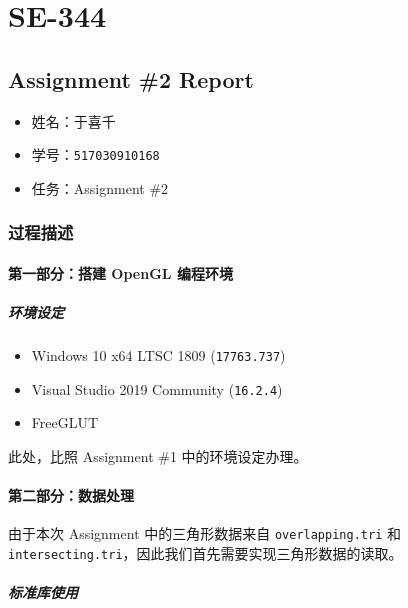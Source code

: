 \documentclass[
]{article}
\date{}
\begin{document}
\hypertarget{header-n0}{%
\section{SE-344}\label{header-n0}}

\hypertarget{header-n2}{%
\subsection{Assignment \#2 Report}\label{header-n2}}

\begin{itemize}
\item
  姓名：于喜千
\item
  学号：\texttt{517030910168}
\item
  任务：Assignment \#2
\end{itemize}

\hypertarget{header-n10}{%
\subsubsection{过程描述}\label{header-n10}}

\hypertarget{header-n11}{%
\paragraph{第一部分：搭建 OpenGL 编程环境}\label{header-n11}}

\hypertarget{header-n12}{%
\subparagraph{环境设定}\label{header-n12}}

\begin{itemize}
\item
  Windows 10 x64 LTSC 1809 (\texttt{17763.737})
\item
  Visual Studio 2019 Community (\texttt{16.2.4})
\item
  FreeGLUT
\end{itemize}

此处，比照 Assignment \#1 中的环境设定办理。

\hypertarget{header-n21}{%
\paragraph{第二部分：数据处理}\label{header-n21}}

由于本次 Assignment 中的三角形数据来自 \texttt{overlapping.tri} 和
\texttt{intersecting.tri}，因此我们首先需要实现三角形数据的读取。

\hypertarget{header-n23}{%
\subparagraph{标准库使用}\label{header-n23}}
\end{document}
